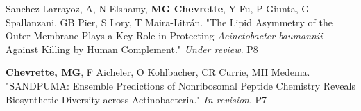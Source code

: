 \begin{cvpubs}


    


  \cvpub
    {Sanchez-Larrayoz, A, N Elshamy, \textbf{MG Chevrette}, Y Fu, P Giunta, G Spallanzani, GB Pier, S Lory, T Maira-Litr\'{a}n. "The Lipid Asymmetry of the Outer Membrane Plays a Key Role in Protecting \textit{Acinetobacter baumannii} Against Killing by Human Complement." \textit{Under review}.} %
    {P8} %

  \cvpub
    {\textbf{Chevrette, MG}, F Aicheler, O Kohlbacher, CR Currie, MH Medema. "SANDPUMA: Ensemble Predictions of Nonribosomal Peptide Chemistry Reveals Biosynthetic Diversity across Actinobacteria." \textit{In revision}. } %
    {P7} %
    

\end{cvpubs}
